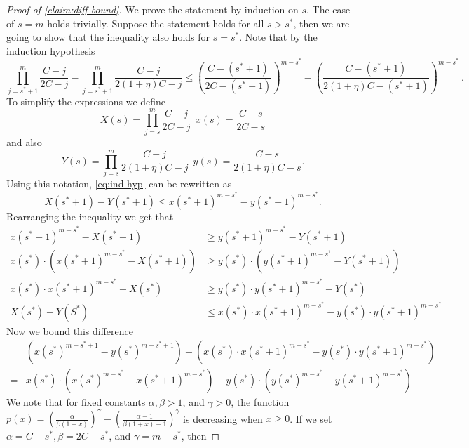 \documentclass[10pt,a4paper]{article}
\newcommand{\prettyref}[1]{\cref{#1}}
\theoremstyle{definition}
\theoremstyle{remark}
\renewcommand{\le}{\leqslant}
\renewcommand{\ge}{\geqslant}
\numberwithin{equation}{section}
\let\pref=\prettyref
\begin{document}
\begin{proof}[Proof of \pref{claim:diff-bound}]
    We prove the statement by induction on $s$. The case of $s = m$ holds trivially. Suppose the statement holds for all $s>s^*$,  then we are going to show that the inequality also holds for $s = s^*$.
    Note that by the induction hypothesis
     \begin{equation}\label{eq:ind-hyp}
     \prod_{j=s^*+1}^{m}\frac{C-j}{2C-j} - \prod_{j=s^*+1}^{m}\frac{C-j}{2(1+\eta)C-j} \le \left(\frac{C-(s^*+1)}{2C-(s^*+1)}\right)^{m-s^*} - \left(\frac{C-(s^*+1)}{2(1+\eta)C-(s^*+1)}\right)^{m-s^*}~.
     \end{equation}
     To simplify the expressions we define
     \[X(s) = \prod_{j=s}^{m}\frac{C-j}{2C-j}~~x(s) = \frac{C-s}{2C-s}\]
     and also 
     \[Y(s) = \prod_{j=s}^{m}\frac{C-j}{2(1+\eta)C-j}~~y(s) = \frac{C-s}{2(1+\eta)C-s}.\]
     Using this notation, \eqref{eq:ind-hyp} can be rewritten as 
     \begin{equation*}
         X(s^*+1) - Y(s^*+1) \le x(s^*+1)^{m-s^*} - y(s^*+1)^{m-s^*}.
     \end{equation*}
     Rearranging the inequality we get that
     \begin{align}
         x(s^*+1)^{m-s^*} - X(s^*+1) &\ge y(s^*+1)^{m-s^*} - Y(s^*+1) \nonumber\\
         x(s^*)\cdot(x(s^*+1)^{m-s^*} - X(s^*+1)) &\ge y(s^*)\cdot(y(s^*+1)^{m-s^1} - Y(s^*+1)) \nonumber\\
          x(s^*)\cdot x(s^*+1)^{m-s^*} - X(s^*) &\ge y(s^*)\cdot y(s^*+1)^{m-s^*}- Y(s^*) \nonumber\\
          X(s^*) - Y(S^*) &\le x(s^*)\cdot x(s^*+1)^{m-s^*}  - y(s^*)\cdot y(s^*+1)^{m-s^*} \label{eq:X-Y-bound}
     \end{align}
     Now we bound this difference
     \begin{align}
         &\left(x(s^*)^{m-s^*+1} - y(s^*)^{m-s^*+1}\right) - \left(x(s^*)\cdot x(s^*+1)^{m-s^*}  - y(s^*)\cdot y(s^*+1)^{m-s^*}\right) \nonumber\\
        = & x(s^*)\cdot \left(x(s^*)^{m-s^*} - x(s^*+1)^{m-s^*}\right) - y(s^*) \cdot \left(y(s^*)^{m-s^*} - y(s^*+1)^{m-s^*}\right) \label{eq:x-y-bound}
     \end{align}
     We note that for fixed constants $\alpha, \beta > 1 $, and $\gamma > 0$, the function $p(x) = \left(\frac{\alpha}{\beta(1+x)}\right)^\gamma - \left(\frac{\alpha-1}{\beta(1+x)-1}\right)^\gamma$ is decreasing when $ x\ge 0$. If we set $\alpha = C-s^*, \beta = 2C-s^*$, and $\gamma = m-s^*$, then 

\end{proof}
\end{document}
